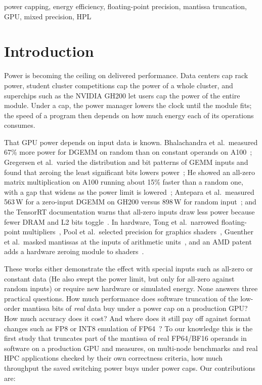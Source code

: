 \documentclass[conference]{IEEEtran}
\newcommand{\W}{\,W}
\newcommand{\pct}{\%}
\begin{document}
\begin{IEEEkeywords}
power capping, energy efficiency, floating-point precision, mantissa truncation, GPU, mixed precision, HPL
\end{IEEEkeywords}

\section{Introduction}

Power is becoming the ceiling on delivered performance. Data centers cap rack power, student cluster
competitions cap the power of a whole cluster, and superchips such as the NVIDIA GH200 let users cap the power
of the entire module. Under a cap, the power manager lowers the clock until the module fits; the speed of a
program then depends on how much energy each of its operations consumes.

That GPU power depends on input data is known. Bhalachandra et al.\ measured 67\pct{} more power for DGEMM on
random than on constant operands on A100~\cite{Bhalachandra2022}; Gregersen et al.\ varied the distribution and
bit patterns of GEMM inputs and found that zeroing the least significant bits lowers power~\cite{Gregersen2024};
He showed an all-zero matrix multiplication on A100 running about 15\pct{} faster than a random one, with a gap
that widens as the power limit is lowered~\cite{He2024}; Antepara et al.\ measured 563\W{} for a zero-input DGEMM
on GH200 versus 898\W{} for random input~\cite{Antepara2025}; and the TensorRT documentation warns that all-zero
inputs draw less power because fewer DRAM and L2 bits toggle~\cite{TensorRTDocs}. In hardware, Tong et al.\
narrowed floating-point multipliers~\cite{Tong2000}, Pool et al.\ selected precision for graphics
shaders~\cite{Pool2008,Pool2011}, Guenther et al.\ masked mantissas at the inputs of arithmetic
units~\cite{Guenther2016}, and an AMD patent adds a hardware zeroing module to shaders~\cite{AMD2022}.

These works either demonstrate the effect with special inputs such as all-zero or constant data (He also swept the
power limit, but only for all-zero against random inputs) or require new hardware or simulated energy. None answers
three practical questions. How much performance does software truncation of the low-order mantissa bits of
\emph{real} data buy under a power cap on a production GPU? How much accuracy does it cost? And where does it still
pay off against format changes such as FP8 or INT8 emulation of FP64~\cite{Ozaki2025,Uchino2025}? To our knowledge
this is the first study that truncates part of the mantissa of real FP64/BF16 operands in software on a production
GPU and measures, on multi-node benchmarks and real HPC applications checked by their own correctness criteria, how
much throughput the saved switching power buys under power caps. Our contributions are:
\end{document}
